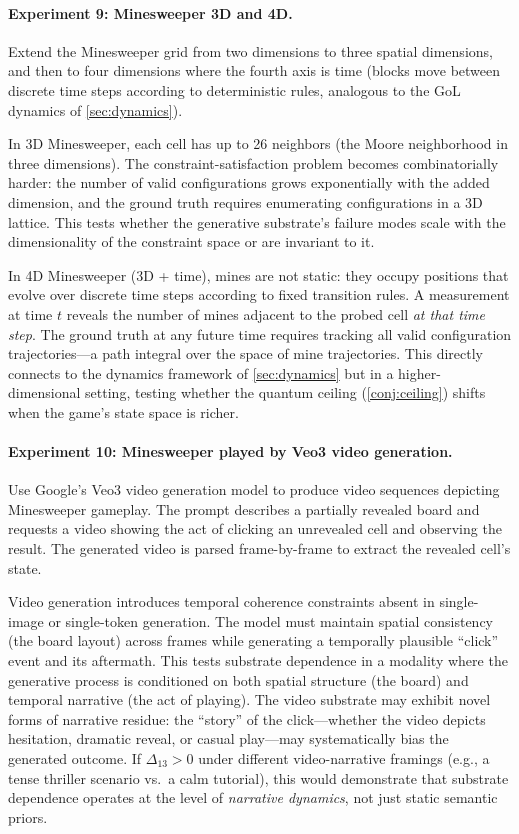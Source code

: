 \documentclass[12pt,a4paper]{article}
\theoremstyle{definition}
\theoremstyle{remark}
\begin{document}
\paragraph{Experiment 9: Minesweeper 3D and 4D.}
Extend the Minesweeper grid from two dimensions to three spatial dimensions, and then to four dimensions where the fourth axis is time (blocks move between discrete time steps according to deterministic rules, analogous to the GoL dynamics of \cref{sec:dynamics}).

In 3D Minesweeper, each cell has up to 26 neighbors (the Moore neighborhood in three dimensions).  The constraint-satisfaction problem becomes combinatorially harder: the number of valid configurations grows exponentially with the added dimension, and the ground truth requires enumerating configurations in a 3D lattice.  This tests whether the generative substrate's failure modes scale with the dimensionality of the constraint space or are invariant to it.

In 4D Minesweeper (3D + time), mines are not static: they occupy positions that evolve over discrete time steps according to fixed transition rules.  A measurement at time $t$ reveals the number of mines adjacent to the probed cell \emph{at that time step}.  The ground truth at any future time requires tracking all valid configuration trajectories---a path integral over the space of mine trajectories.  This directly connects to the dynamics framework of \cref{sec:dynamics} but in a higher-dimensional setting, testing whether the quantum ceiling (\cref{conj:ceiling}) shifts when the game's state space is richer.

\paragraph{Experiment 10: Minesweeper played by Veo3 video generation.}
Use Google's Veo3 video generation model to produce video sequences depicting Minesweeper gameplay.  The prompt describes a partially revealed board and requests a video showing the act of clicking an unrevealed cell and observing the result.  The generated video is parsed frame-by-frame to extract the revealed cell's state.

Video generation introduces temporal coherence constraints absent in single-image or single-token generation.  The model must maintain spatial consistency (the board layout) across frames while generating a temporally plausible ``click'' event and its aftermath.  This tests substrate dependence in a modality where the generative process is conditioned on both spatial structure (the board) and temporal narrative (the act of playing).  The video substrate may exhibit novel forms of narrative residue: the ``story'' of the click---whether the video depicts hesitation, dramatic reveal, or casual play---may systematically bias the generated outcome.  If $\Delta_{13} > 0$ under different video-narrative framings (e.g., a tense thriller scenario vs.\ a calm tutorial), this would demonstrate that substrate dependence operates at the level of \emph{narrative dynamics}, not just static semantic priors.
\end{document}
